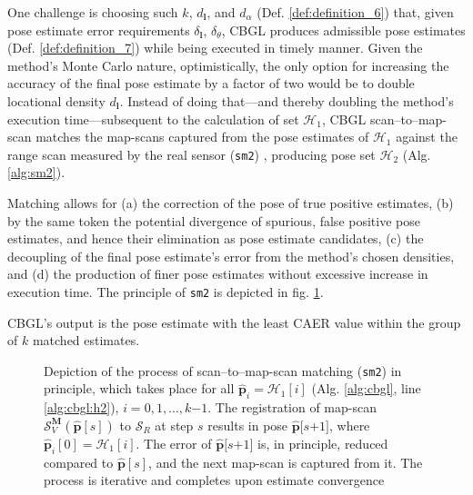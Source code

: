 One challenge is choosing such $k$, $d_{\bm{l}}$, and $d_\alpha$ (Def.
\ref{def:definition_6}) that, given pose estimate error requirements
$\delta_{\bm{l}}$, $\delta_{\theta}$, CBGL produces admissible pose estimates
(Def. \ref{def:definition_7}) while being executed in timely manner.  Given the
method's Monte Carlo nature, optimistically, the only option for increasing the
accuracy of the final pose estimate by a factor of two would be to double
locational density $d_{\bm{l}}$. Instead of doing that---and thereby doubling
the method's execution time---subsequent to the calculation of set
$\mathcal{H}_1$, CBGL scan--to--map-scan matches the map-scans captured from
the pose estimates of $\mathcal{H}_1$ against the range scan measured by the
real sensor (\texttt{sm2}) \cite{Vasiljevic2016c,Filotheou2023a}, producing
pose set $\mathcal{H}_2$ (Alg. \ref{alg:sm2}).

Matching allows for (a) the correction of the pose of true positive estimates,
(b) by the same token the potential divergence of spurious, false positive
pose estimates, and hence their elimination as pose estimate candidates, (c)
the decoupling of the final pose estimate's error from the method's chosen
densities, and (d) the production of finer pose estimates without excessive
increase in execution time. The principle of \texttt{sm2} is depicted in fig.
\ref{fig:sm2_evolution}.

CBGL's output is the pose estimate with the least CAER value within the
group of $k$ matched estimates.


\begin{figure}[H]\vspace{1.3cm}
  
  \caption{\small Depiction of the process of scan--to--map-scan matching
           (\texttt{sm2}) in principle, which takes place for all
           $\hat{\bm{p}}_i = \mathcal{H}_1[i]$ (Alg.
           \ref{alg:cbgl}, line \ref{alg:cbgl:h2}), $i=0,1,\dots,k$$-$$1$. The registration of map-scan
           $\mathcal{S}_V^{\bm{M}}(\hat{\bm{p}}[s])$ to $\mathcal{S}_R$ at step
           $s$ results in pose $\hat{\bm{p}}[s$$+$$1]$, where
           $\hat{\bm{p}}_i[0] = \mathcal{H}_1[i]$. The error of
           $\hat{\bm{p}}[s$$+$$1]$ is, in principle, reduced compared to
           $\hat{\bm{p}}[s]$, and the next map-scan is captured from it. The
           process is iterative and completes upon estimate convergence}
  \label{fig:sm2_evolution}
\end{figure}



